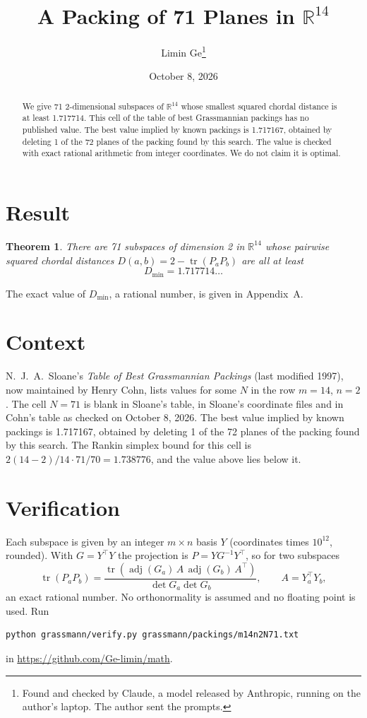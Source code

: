 \documentclass[11pt,a4paper]{article}
\title{A Packing of 71 Planes in $\mathbb{R}^{14}$}
\author{Limin Ge\thanks{Found and checked by Claude, a model released by Anthropic, running on the author's laptop. The author sent the prompts.}}
\date{October 8, 2026}
\newtheorem*{theorem}{Theorem}
\begin{document}
\maketitle
\begin{abstract}
We give 71 2-dimensional subspaces of $\mathbb{R}^{14}$ whose smallest squared chordal distance is at least 1.717714. This cell of the table of best Grassmannian packings has no published value. The best value implied by known packings is 1.717167, obtained by deleting 1 of the 72 planes of the packing found by this search. The value is checked with exact rational arithmetic from integer coordinates. We do not claim it is optimal.
\end{abstract}

\section{Result}
\begin{theorem}
There are 71 subspaces of dimension 2 in $\mathbb{R}^{14}$ whose pairwise squared chordal distances $D(a,b) = 2 - \operatorname{tr}(P_aP_b)$ are all at least
\[ D_{\min} = 1.717714\ldots \]
\end{theorem}
The exact value of $D_{\min}$, a rational number, is given in Appendix~A.


\section{Context}
N.~J.~A.~Sloane's \emph{Table of Best Grassmannian Packings} (last modified 1997), now maintained by Henry Cohn, lists values for some $N$ in the row $m=14$, $n=2$. The cell $N=71$ is blank in Sloane's table, in Sloane's coordinate files and in Cohn's table as checked on October 8, 2026. The best value implied by known packings is 1.717167, obtained by deleting 1 of the 72 planes of the packing found by this search. The Rankin simplex bound for this cell is $2(14-2)/14\cdot 71/70 = 1.738776$, and the value above lies below it.


\section{Verification}
Each subspace is given by an integer $m\times n$ basis $Y$ (coordinates times $10^{12}$, rounded). With $G=Y^\top Y$ the projection is $P=YG^{-1}Y^\top$, so for two subspaces
\[ \operatorname{tr}(P_aP_b)=\frac{\operatorname{tr}(\operatorname{adj}(G_a)\,A\,\operatorname{adj}(G_b)\,A^\top)}{\det G_a\det G_b},\qquad A=Y_a^\top Y_b, \]
an exact rational number. No orthonormality is assumed and no floating point is used. Run
\begin{verbatim}
python grassmann/verify.py grassmann/packings/m14n2N71.txt
\end{verbatim}
in \url{https://github.com/Ge-limin/math}.
\end{document}

